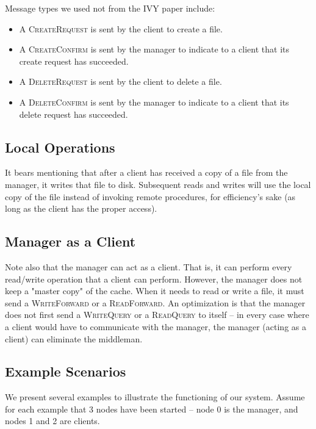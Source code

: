 \documentclass[12pt]{article}	%
\begin{document}
Message types we used not from the IVY paper include:

\begin{itemize}
\item A \textsc{CreateRequest} is sent by the client to create a file.
\item A \textsc{CreateConfirm} is sent by the manager to indicate to a client that its create request has succeeded.
\item A \textsc{DeleteRequest} is sent by the client to delete a file.
\item A \textsc{DeleteConfirm} is sent by the manager to indicate to a client that its delete request has succeeded.
\end{itemize}

\subsection{Local Operations}

It bears mentioning that after a client has received a copy of a file from the manager, it writes that file to disk. Subsequent reads and writes will use the local copy of the file instead of invoking remote procedures, for efficiency's sake (as long as the client has the proper access).

\subsection{Manager as a Client}

Note also that the manager can act as a client. That is, it can perform every read/write operation that a client can perform. However, the manager does not keep a "master copy" of the cache. When it needs to read or write a file, it must send a \textsc{WriteForward} or a \textsc{ReadForward}. An optimization is that the manager does not first send a \textsc{WriteQuery} or a \textsc{ReadQuery} to itself -- in every case where a client would have to communicate with the manager, the manager (acting as a client) can eliminate the middleman.

\subsection{Example Scenarios}

We present several examples to illustrate the functioning of our system. Assume for each example that 3 nodes have been started -- node 0 is the manager, and nodes 1 and 2 are clients.
\end{document}
